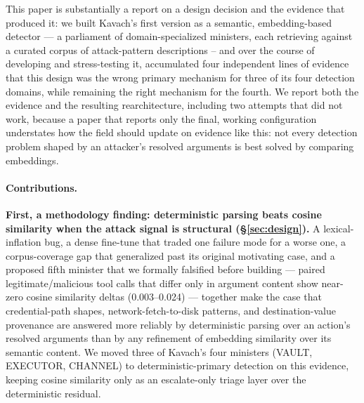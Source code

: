 \documentclass[sigconf,anonymous,review]{acmart}
\begin{document}
This paper is substantially a report on a design decision and the evidence
that produced it: we built Kavach's first version as a semantic,
embedding-based detector --- a parliament of domain-specialized ministers,
each retrieving against a curated corpus of attack-pattern descriptions --
and over the course of developing and stress-testing it, accumulated four
independent lines of evidence that this design was the wrong primary
mechanism for three of its four detection domains, while remaining the right
mechanism for the fourth. We report both the evidence and the resulting
rearchitecture, including two attempts that did not work, because a paper
that reports only the final, working configuration understates how the field
should update on evidence like this: not every detection problem shaped by
an attacker's resolved arguments is best solved by comparing embeddings.

\paragraph{Contributions.}

\textbf{First, a methodology finding: deterministic parsing beats cosine
similarity when the attack signal is structural (\S\ref{sec:design}).} A
lexical-inflation bug, a dense fine-tune that traded one failure mode for a
worse one, a corpus-coverage gap that generalized past its original
motivating case, and a proposed fifth minister that we formally falsified
before building --- paired legitimate/malicious tool calls that differ only
in argument content show near-zero cosine similarity deltas (0.003--0.024)
--- together make the case that credential-path shapes, network-fetch-to-disk
patterns, and destination-value provenance are answered more reliably by
deterministic parsing over an action's resolved arguments than by any
refinement of embedding similarity over its semantic content. We moved
three of Kavach's four ministers (VAULT, EXECUTOR, CHANNEL) to
deterministic-primary detection on this evidence, keeping cosine similarity
only as an escalate-only triage layer over the deterministic residual.
\end{document}
